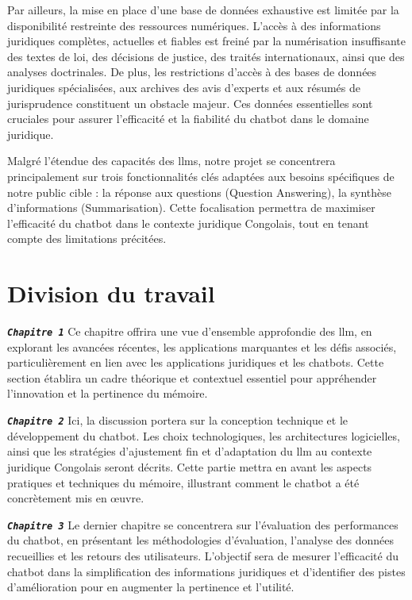 Par ailleurs, la mise en place d'une base de données exhaustive est limitée par la disponibilité restreinte des ressources numériques. L'accès à des informations juridiques complètes, actuelles et fiables est freiné par la numérisation insuffisante des textes de loi, des décisions de justice, des traités internationaux, ainsi que des analyses doctrinales. De plus, les restrictions d'accès à des bases de données juridiques spécialisées, aux archives des avis d'experts et aux résumés de jurisprudence constituent un obstacle majeur. Ces données essentielles sont cruciales pour assurer l'efficacité et la fiabilité du chatbot dans le domaine juridique.

Malgré l'étendue des capacités des \acfp{llm}, notre projet se concentrera principalement sur trois fonctionnalités clés adaptées aux besoins spécifiques de notre public cible : la réponse aux questions (Question Answering), la synthèse d'informations (Summarisation). Cette focalisation permettra de maximiser l'efficacité du chatbot dans le contexte juridique Congolais, tout en tenant compte des limitations précitées.

\section{Division du travail}
		
\begin{list}{}{En dehors de l'introduction, la partie conclusive et l'annexe, ce travail est organisé en trois chapitres comme suit:}
    \item \textbf{\textsl{\texttt{Chapitre 1}}} Ce chapitre offrira une vue d'ensemble approfondie des \ac{llm}, en explorant les avancées récentes, les applications marquantes et les défis associés, particulièrement en lien avec les applications juridiques et les chatbots. Cette section établira un cadre théorique et contextuel essentiel pour appréhender l'innovation et la pertinence du mémoire.
    
    \item \textbf{\textsl{\texttt{Chapitre 2}}} Ici, la discussion portera sur la conception technique et le développement du chatbot. Les choix technologiques, les architectures logicielles, ainsi que les stratégies d'ajustement fin et d'adaptation du \ac{llm} au contexte juridique Congolais seront décrits. Cette partie mettra en avant les aspects pratiques et techniques du mémoire, illustrant comment le chatbot a été concrètement mis en œuvre.

    \item \textbf{\textsl{\texttt{Chapitre 3}}} Le dernier chapitre se concentrera sur l'évaluation des performances du chatbot, en présentant les méthodologies d'évaluation, l'analyse des données recueillies et les retours des utilisateurs. L'objectif sera de mesurer l'efficacité du chatbot dans la simplification des informations juridiques et d'identifier des pistes d'amélioration pour en augmenter la pertinence et l'utilité.
\end{list}
